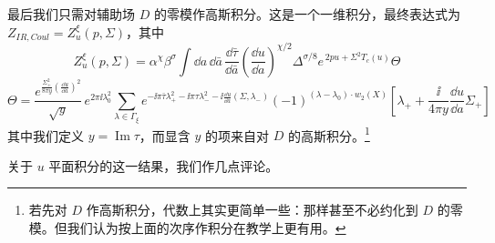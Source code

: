 最后我们只需对辅助场 $D$ 的零模作高斯积分。这是一个一维积分，最终表达式为 $Z_{IR,Coul}=Z_u^{\xi}(p,\Sigma)$，其中
\begin{equation}
Z_u^{\xi}(p,\Sigma)
=
\alpha^{\chi}\beta^{\sigma}
\int
\dd a\,\dd\bar a\,
\frac{\dd\bar\tau}{\dd\bar a}
\left(\frac{\dd u}{\dd a}\right)^{\chi/2}
\Delta^{\sigma/8}
e^{\,2pu+\Sigma^{2}T_c(u)}
\Theta
\tag{7.6}
\end{equation}
\begin{equation}
\Theta=
\frac{e^{\frac{\Sigma_+^{2}}{8\pi y}\left(\frac{\dd u}{\dd a}\right)^{2}}}{\sqrt{y}}
\,e^{2\pi\ii\lambda_0^{2}}
\sum_{\lambda\in\Gamma_{\xi}}
e^{-\ii\pi\bar\tau\lambda_+^{2}-\ii\pi\tau\lambda_-^{2}-\ii\frac{\dd u}{\dd a}(\Sigma,\lambda_-)}
(-1)^{(\lambda-\lambda_0)\cdot w_2(X)}
\left[\lambda_+ + \frac{\ii}{4\pi y}\frac{\dd u}{\dd a}\Sigma_+\right]
\tag{7.7}
\end{equation}
其中我们定义 $y=\operatorname{Im}\tau$，而显含 $y$ 的项来自对 $D$ 的高斯积分。\footnote{若先对 $D$ 作高斯积分，代数上其实更简单一些：那样甚至不必约化到 $D$ 的零模。但我们认为按上面的次序作积分在教学上更有用。}

关于 $u$ 平面积分的这一结果，我们作几点评论。

